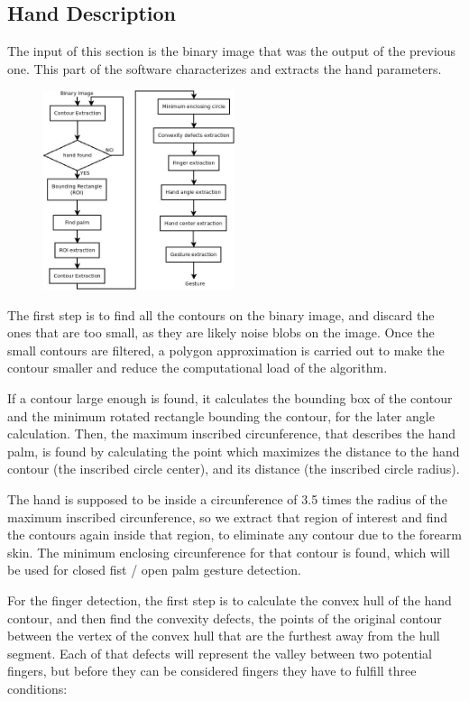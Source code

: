  
\subsection{Hand Description}

The input of this section is the binary image that was the output of the previous one. This part of the software characterizes and extracts the hand parameters. 

\begin{figure}[H]
	\centering
	\includegraphics[width=0.5\textwidth]{../hand_description.jpeg} 
\end{figure}


The first step is to find all the contours on the binary image, and discard the ones that are too small, as they are likely noise blobs on the image. Once the small contours are filtered, a polygon approximation is carried out to make the contour smaller and reduce the computational load of the algorithm.

If a contour large enough is found, it calculates the bounding box of the contour and the minimum rotated rectangle bounding the contour, for the later angle calculation. Then, the maximum inscribed circunference, that describes the hand palm, is found by calculating the point which maximizes the distance to the hand contour (the inscribed circle center), and its distance (the inscribed circle radius).

The hand is supposed to be inside a circunference of 3.5 times the radius of the maximum inscribed circunference, so we extract that region of interest and find the contours again inside that region, to eliminate any contour due to the forearm skin. The minimum enclosing circunference for that contour is found, which will be used for closed fist / open palm gesture detection.

For the finger detection, the first step is to calculate the convex hull of the hand contour, and then find the convexity defects, the points of the original contour between the vertex of the convex hull that are the furthest away from the hull segment. Each of that defects will represent the valley between two potential fingers, but before they can be considered fingers they have to fulfill three conditions:

